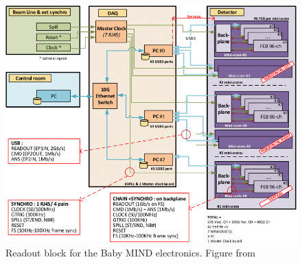 \begin{figure}[h!]
\centering
\includegraphics[width=\textwidth]{figures/fullDAQ.png}
\caption{Readout block for the Baby MIND electronics. Figure from \cite{52Georgi}}
\label{fig:daqChain}
\end{figure}




